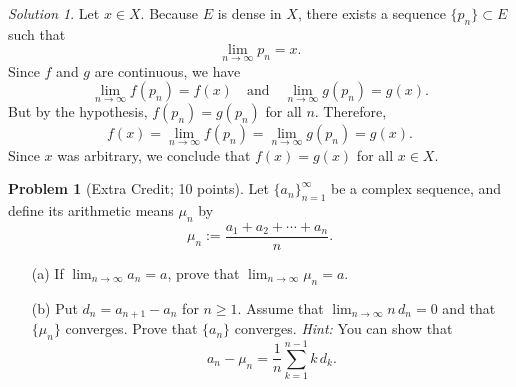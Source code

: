\documentclass[12pt,oneside]{article}
\theoremstyle{definition}
\newtheorem{problem}{Problem}
\theoremstyle{remark}
\newtheorem*{solution}{Solution}
\begin{document}
\begin{solution}
Let \(x\in X\). Because \(E\) is dense in \(X\), there exists a sequence \(\{p_n\} \subset E\) such that
\[
\lim_{n\to\infty} p_n = x.
\]
Since \(f\) and \(g\) are continuous, we have
\[
\lim_{n\to\infty}f(p_n)=f(x) \quad \text{and} \quad \lim_{n\to\infty}g(p_n)=g(x).
\]
But by the hypothesis, \(f(p_n)=g(p_n)\) for all \(n\). Therefore,
\[
f(x)=\lim_{n\to\infty} f(p_n)=\lim_{n\to\infty} g(p_n)=g(x).
\]
Since \(x\) was arbitrary, we conclude that \(f(x)=g(x)\) for all \(x\in X\).
\end{solution}

\begin{problem}[Extra Credit; 10 points]
Let \(\{a_n\}_{n=1}^{\infty}\) be a complex sequence, and define its arithmetic means \(\mu_n\) by
\[
\mu_n := \frac{a_1 + a_2 + \cdots + a_n}{n}.
\]
\begin{enumerate}
\item[(a)] If \(\displaystyle \lim_{n\rightarrow \infty} a_n = a\), prove that \(\displaystyle \lim_{n\rightarrow \infty} \mu_n = a\). 
\item[(b)] Put \(d_n = a_{n+1} - a_{n}\) for \(n\geq 1\). 
Assume that \(\displaystyle \lim_{n\rightarrow \infty} n\, d_n = 0\) and that \(\{\mu_n\}\) converges. 
Prove that \(\{a_n\}\) converges. 
\emph{Hint:} You can show that
\[
a_n - \mu_n = \frac{1}{n}\sum_{k=1}^{n-1} k\, d_k.
\]
\end{enumerate}
\end{problem}
\end{document}
